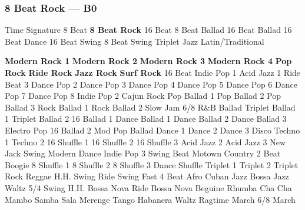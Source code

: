 \subsubsection[8 Beat Rock]{8 Beat Rock --- \UiKey{\II}\UiKey{\MET}B0}
Time Signature
8 Beat
\textbf{8 Beat Rock}
16 Beat
8 Beat Ballad
16 Beat Ballad
16 Beat Dance
16 Beat Swing
8 Beat Swing
Triplet
Jazz
Latin/Traditional





























\textbf{Modern Rock 1}
\textbf{Modern Rock 2}
\textbf{Modern Rock 3}
\textbf{Modern Rock 4}
\textbf{Pop Rock}
\textbf{Ride Rock}
\textbf{Jazz Rock}
\textbf{Surf Rock}
16 Beat
Indie Pop 1
Acid Jazz 1
Ride Beat 3
Dance Pop 2
Dance Pop 3
Dance Pop 4
Dance Pop 5
Dance Pop 6
Dance Pop 7
Dance Pop 8
Indie Pop 2
Cajun Rock
Pop Ballad 1
Pop Ballad 2
Pop Ballad 3
Rock Ballad 1
Rock Ballad 2
Slow Jam
6/8 R\&B Ballad
Triplet Ballad 1
Triplet Ballad 2
16 Ballad 1
Dance Ballad 1
Dance Ballad 2
Dance Ballad 3
Electro Pop
16 Ballad 2
Mod Pop Ballad
Dance 1
Dance 2
Dance 3
Disco
Techno 1
Techno 2
16 Shuffle 1
16 Shuffle 2
16 Shuffle 3
Acid Jazz 2
Acid Jazz 3
New Jack Swing
Modern Dance
Indie Pop 3
Swing Beat
Motown
Country 2 Beat
Boogie
8 Shuffle 1
8 Shuffle 2
8 Shuffle 3
Dance Shuffle
Triplet 1
Triplet 2
Triplet Rock
Reggae
H.H. Swing
Ride Swing
Fast 4 Beat
Afro Cuban
Jazz Bossa
Jazz Waltz
5/4 Swing
H.H. Bossa Nova
Ride Bossa Nova
Beguine
Rhumba
Cha Cha
Mambo
Samba
Sala
Merenge
Tango
Habanera
Waltz
Ragtime
March
6/8 March
